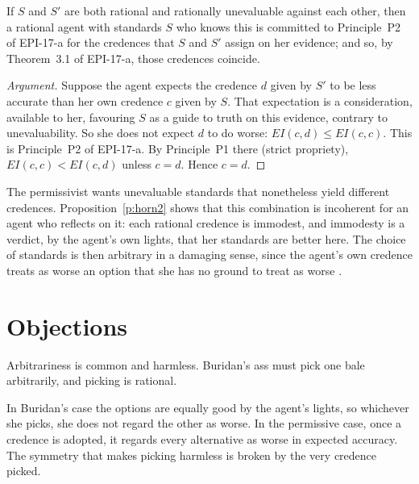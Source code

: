 \documentclass{situationist-preprint}
\begin{document}
\begin{proposition}\label{p:horn2}
If $S$ and $S'$ are both rational and rationally unevaluable against each other, then a rational agent with standards $S$ who knows this is committed to Principle~P2 of EPI-17-a for the credences that $S$ and $S'$ assign on her evidence; and so, by Theorem~3.1 of EPI-17-a, those credences coincide.
\end{proposition}

\begin{proof}[Argument]
Suppose the agent expects the credence $d$ given by $S'$ to be less accurate than her own credence $c$ given by $S$. That expectation is a consideration, available to her, favouring $S$ as a guide to truth on this evidence, contrary to unevaluability. So she does not expect $d$ to do worse: $\mathit{EI}(c,d) \leq \mathit{EI}(c,c)$. This is Principle~P2 of EPI-17-a. By Principle~P1 there (strict propriety), $\mathit{EI}(c,c) < \mathit{EI}(c,d)$ unless $c = d$. Hence $c = d$.
\end{proof}

The permissivist wants unevaluable standards that nonetheless yield different credences. Proposition~\ref{p:horn2} shows that this combination is incoherent for an agent who reflects on it: each rational credence is immodest, and immodesty is a verdict, by the agent's own lights, that her standards are better here. The choice of standards is then arbitrary in a damaging sense, since the agent's own credence treats as worse an option that she has no ground to treat as worse \citep{White2005}.

\section{Objections}

\begin{objection}
Arbitrariness is common and harmless. Buridan's ass must pick one bale arbitrarily, and picking is rational.
\end{objection}

\begin{reply}
In Buridan's case the options are equally good by the agent's lights, so whichever she picks, she does not regard the other as worse. In the permissive case, once a credence is adopted, it regards every alternative as worse in expected accuracy. The symmetry that makes picking harmless is broken by the very credence picked.
\end{reply}
\end{document}
